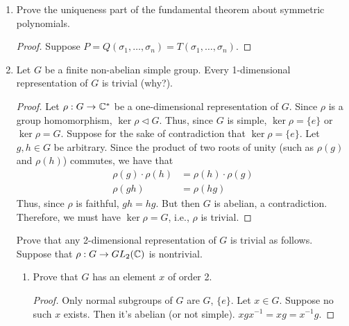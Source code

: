 \documentclass[../psets.tex]{subfiles}
\begin{document}
\begin{enumerate}
\begin{proof}
        \begin{equation*}
            \dim(V) \mid |G|/|Z(G)| = (G:Z(G))
        \end{equation*}
        as desired.
    \end{proof}
    \item Prove the uniqueness part of the fundamental theorem about symmetric polynomials.
    \begin{proof}
        Suppose $P=Q(\sigma_1,\dots,\sigma_n)=T(\sigma_1,\dots,\sigma_n)$.
    \end{proof}
    \item Let $G$ be a finite non-abelian simple group. Every 1-dimensional representation of $G$ is trivial (why?).
    \begin{proof}
        Let $\rho:G\to\mathbb{C}^*$ be a one-dimensional representation of $G$. Since $\rho$ is a group homomorphism, $\ker\rho\triangleleft G$. Thus, since $G$ is simple, $\ker\rho=\{e\}$ or $\ker\rho=G$. Suppose for the sake of contradiction that $\ker\rho=\{e\}$. Let $g,h\in G$ be arbitrary. Since the product of two roots of unity (such as $\rho(g)$ and $\rho(h)$) commutes, we have that
        \begin{align*}
            \rho(g)\cdot\rho(h) &= \rho(h)\cdot\rho(g)\\
            \rho(gh) &= \rho(hg)
        \end{align*}
        Thus, since $\rho$ is faithful, $gh=hg$. But then $G$ is abelian, a contradiction. Therefore, we must have $\ker\rho=G$, i.e., $\rho$ is trivial.
    \end{proof}
    Prove that any 2-dimensional representation of $G$ is trivial as follows. Suppose that $\rho:G\to GL_2(\mathbb{C})$ is nontrivial.
    \begin{enumerate}
        \item Prove that $G$ has an element $x$ of order 2.
        \begin{proof}
            Only normal subgroups of $G$ are $G$, $\{e\}$. Let $x\in G$. Suppose no such $x$ exists. Then it's abelian (or not simple). $xgx^{-1}=xg=x^{-1}g$.


\end{proof}
\end{enumerate}
\end{enumerate}
\end{document}
